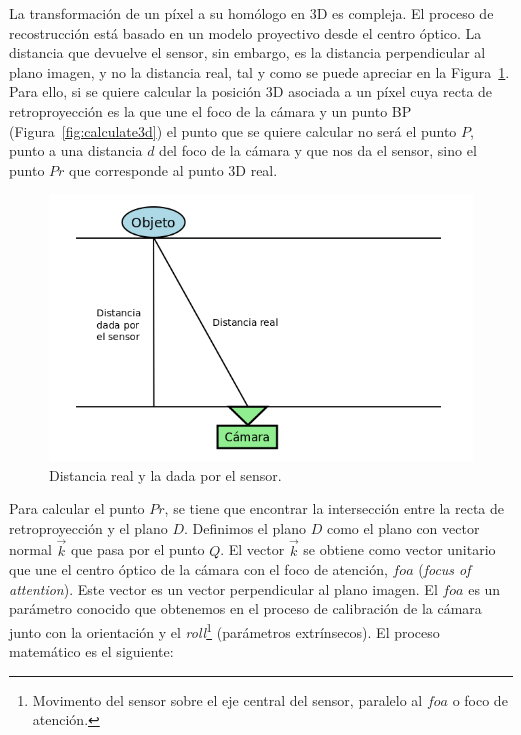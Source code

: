 La transformación de un píxel a su homólogo en 3D es compleja. El proceso de recostrucción está basado en un modelo proyectivo desde el centro óptico. La distancia que devuelve el sensor, sin embargo, es la distancia perpendicular al plano imagen, y no la distancia real, tal y como se puede apreciar en la Figura~\ref{fig:distPoint}. Para ello, si se quiere calcular la posición 3D asociada a un píxel cuya recta de retroproyección es la que une el foco de la cámara y un punto BP (Figura~\ref{fig:calculate3d}) el punto que se quiere calcular no será el punto $P$, punto a una distancia $d$ del foco de la cámara y que nos da el sensor, sino el punto $Pr$ que corresponde al punto 3D real.

\begin{figure}[th]
\centering
\includegraphics[scale=0.4]{Figures/dist-point.png}
\decoRule
\caption[Distancia real y la dada por el sensor]{Distancia real y la dada por el sensor.}
\label{fig:distPoint}
\end{figure}

Para calcular el punto $Pr$, se tiene que encontrar la intersección entre la recta de retroproyección y el plano $D$. Definimos el plano $D$ como el plano con vector normal $\vec{k}$ que pasa por el punto $Q$. El vector $\vec{k}$ se obtiene como vector unitario que une el centro óptico de la cámara con el foco de atención, $foa$ (\textit{focus of attention}). Este vector es un vector perpendicular al plano imagen. El $foa$ es un parámetro conocido que obtenemos en el proceso de calibración de la cámara junto con la orientación y el \textit{roll}\footnote{Movimento del sensor sobre el eje central del sensor, paralelo al $foa$ o foco de atención.} (parámetros extrínsecos). El proceso matemático es el siguiente:

